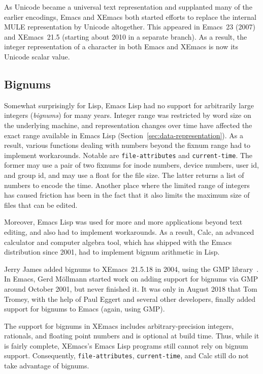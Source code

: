 \documentclass[format=acmsmall,screen]{acmart}
\newcommand \Elisp {Emacs Lisp}
\begin{document}
As Unicode became a universal text representation and supplanted many
of the earlier encodings, Emacs and XEmacs both started efforts to
replace the internal MULE representation by Unicode altogether.  This
appeared in Emacs~23 (2007) and XEmacs~21.5 (starting about 2010 in a
separate branch).  As a result, the integer representation of a
character in both Emacs and XEmacs is now its Unicode scalar value.


\subsection{Bignums}

Somewhat surprisingly for Lisp, \Elisp{} had no support for
arbitrarily large integers (\emph{bignums}) for many years.
Integer range was restricted by word size on the underlying machine,
and representation changes over time have affected the exact range
available in \Elisp{} (Section~\ref{sec:data-representation}).
As a result, various functions dealing with numbers beyond the fixnum range
had to implement workarounds.  Notable are \texttt{file-attributes}
and \texttt{current-time}.  The former
may use a pair of two fixnums for inode numbers, device numbers, user id,
and group id, and may use a float for the file size.  The latter
returns a list of numbers to encode the time.
Another place where the limited range of integers has caused friction has
been in the fact that it also limits the maximum size of files that can
be edited.

Moreover, \Elisp{} was used for more and more applications beyond
text editing, and also had to implement workarounds.  As a result,
Calc, an advanced calculator and computer algebra tool, which has
shipped with the Emacs distribution since 2001, had to implement
bignum arithmetic in Lisp.

Jerry James added bignums to XEmacs~21.5.18 in 2004, using the GMP
library~\cite{GMP}.  In Emacs, Gerd Möllmann started work on adding support
for bignums via GMP around October 2001, but never finished it.  It was only
in August 2018 that Tom Tromey, with the help of Paul Eggert and several
other developers, finally added support for bignums to Emacs (again, using
GMP).

The support for bignums in XEmacs includes arbitrary-precision integers,
rationals, and floating point numbers and is optional at build time. Thus,
while it is fairly complete, XEmacs's \Elisp{} programs still cannot rely on
bignum support.  Consequently, \texttt{file-attributes},
\texttt{current-time}, and Calc still do not take advantage of bignums.
\end{document}
